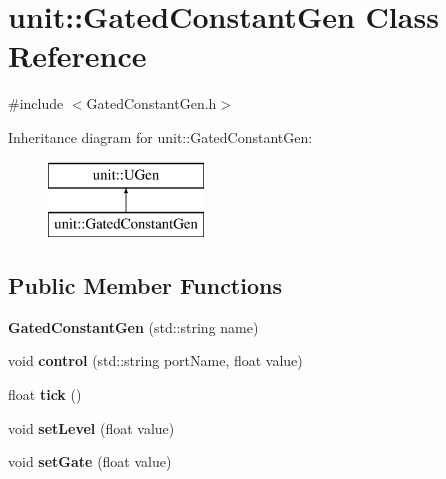 \hypertarget{classunit_1_1GatedConstantGen}{}\section{unit\+:\+:Gated\+Constant\+Gen Class Reference}
\label{classunit_1_1GatedConstantGen}


{\ttfamily \#include $<$Gated\+Constant\+Gen.\+h$>$}

Inheritance diagram for unit\+:\+:Gated\+Constant\+Gen\+:\begin{figure}[H]
\begin{center}
\leavevmode
\includegraphics[height=2.000000cm]{classunit_1_1GatedConstantGen}
\end{center}
\end{figure}
\subsection*{Public Member Functions}
\begin{DoxyCompactItemize}
\item 
{\bfseries Gated\+Constant\+Gen} (std\+::string name)\hypertarget{classunit_1_1GatedConstantGen_ad30ad26411f421228c8f7075b4d27f9a}{}\label{classunit_1_1GatedConstantGen_ad30ad26411f421228c8f7075b4d27f9a}

\item 
void {\bfseries control} (std\+::string port\+Name, float value)\hypertarget{classunit_1_1GatedConstantGen_a8365ddc2a6ddebc86e196fa381a5648d}{}\label{classunit_1_1GatedConstantGen_a8365ddc2a6ddebc86e196fa381a5648d}

\item 
float {\bfseries tick} ()\hypertarget{classunit_1_1GatedConstantGen_aafff659359fed9f28c703acd0076c081}{}\label{classunit_1_1GatedConstantGen_aafff659359fed9f28c703acd0076c081}

\item 
void {\bfseries set\+Level} (float value)\hypertarget{classunit_1_1GatedConstantGen_ad7e158034a66e82387dc13bbc54b0c59}{}\label{classunit_1_1GatedConstantGen_ad7e158034a66e82387dc13bbc54b0c59}

\item 
void {\bfseries set\+Gate} (float value)\hypertarget{classunit_1_1GatedConstantGen_acd088a5cda2580214ae464a56c40849a}{}\label{classunit_1_1GatedConstantGen_acd088a5cda2580214ae464a56c40849a}

\end{DoxyCompactItemize}
